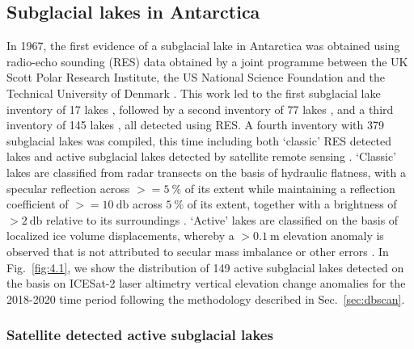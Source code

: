 \subsection{Subglacial lakes in Antarctica}

In 1967, the first evidence of a subglacial lake in Antarctica was obtained using radio-echo sounding (\gls{RES}) data obtained by a joint programme between the UK Scott Polar Research Institute, the US National Science Foundation and the Technical University of Denmark \citep{RobinInterpretationRadioEcho1969}.
This work led to the first subglacial lake inventory of 17 lakes \citep{OswaldLakesAntarcticIce1973}, followed by a second inventory of 77 lakes \citep{SiegertinventoryAntarcticsubglacial1996}, and a third inventory of 145 lakes \citep{SiegertrevisedinventoryAntarctic2005}, all detected using \gls{RES}.
A fourth inventory with 379 subglacial lakes was compiled, this time including both `classic' \gls{RES} detected lakes and active subglacial lakes detected by satellite remote sensing \citep{WrightfourthinventoryAntarctic2012}.
`Classic' lakes are classified from radar transects on the basis of hydraulic flatness, with a specular reflection across $>= \SI{5}{\percent}$ of its extent while maintaining a reflection coefficient of $>= \SI{10}{\decibel}$ across $\SI{5}{\percent}$ of its extent, together with a brightness of $> \SI{2}{\decibel}$ relative to its surroundings \citep{CarterRadarbasedsubglaciallake2007}.
`Active' lakes are classified on the basis of localized ice volume displacements, whereby a $> \SI{0.1}{\metre}$ elevation anomaly is observed that is not attributed to secular mass imbalance or other errors \citep[see][]{Smithinventoryactivesubglacial2009,SiegfriedThirteenyearssubglacial2018}.
In Fig.~\ref{fig:4.1}, we show the distribution of 149 active subglacial lakes detected on the basis on ICESat-2 laser altimetry vertical elevation change anomalies for the 2018-2020 time period following the methodology described in Sec.~\ref{sec:dbscan}.

\subsubsection{Satellite detected active subglacial lakes}

